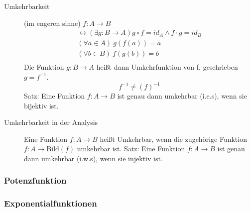 \begin{description}
    \item[Umkehrbarkeit] (im engeren sinne) $f : A \longrightarrow B$
    \begin{gather*}
        \leftrightarrow (\exists g : B \longrightarrow A) g \circ f = id_A \wedge f \cdot g = id_B\\
        (\forall a \in A)\ g(f(a)) = a\\
        (\forall b \in B)\ f(g(b)) = b\\
    \end{gather*}
    Die Funktion $g : B \longrightarrow A$ heißt dann Umkehrfunktion von f, geschrieben $g = f^{-1}$.
    \[f^{-1} \not = (f)^{-1}\]
    Satz: Eine Funktion $f : A \longrightarrow B$ ist genau dann umkehrbar (i.e.s), wenn sie bijektiv ist.
    \item[Umkehrbarkeit in der Analysis] Eine Funktion $f : A \longrightarrow B$ heißt Umkehrbar, wenn die zugehörige Funktion $f : A \longrightarrow \textrm{Bild}(f)$ umkehrbar ist.
    Satz: Eine Funktion $f : A \longrightarrow B$ ist genau dann umkehrbar (i.w.s), wenn sie injektiv ist.
\end{description}

\subsubsection{Potenzfunktion}


\subsubsection{Exponentialfunktionen}

